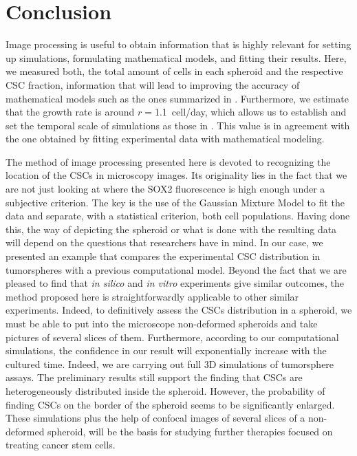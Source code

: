 \documentclass[fleqn,10pt]{wlscirep}
\begin{document}
\section*{Conclusion} \label{s: conc}

Image processing is useful to obtain information that is highly relevant for setting up simulations, formulating mathematical models, and fitting their results. Here, we measured both, the total amount of cells in each spheroid and the respective CSC fraction, information that will lead to improving the accuracy of mathematical models such as the ones summarized in \cite{barberis2021diff}. Furthermore, we estimate that the growth rate is around $r=$\SI{1.1}{cell/day}, which allows us to establish and set the temporal scale of simulations as those in \cite{barberis2021percolation}. This value is in agreement with the one obtained by fitting experimental data with mathematical modeling\cite{benitez2021}. 


The method of image processing presented here is devoted to recognizing the location of the CSCs in microscopy images. Its originality lies in the fact that we are not just looking at where the SOX2 fluorescence is high enough under a subjective criterion. The key is the use of the Gaussian Mixture Model to fit the data and separate, with a statistical criterion, both cell populations. Having done this, the way of depicting the spheroid or what is done with the resulting data will depend on the questions that researchers have in mind. In our case, we presented an example that compares the experimental CSC distribution in tumorspheres with a previous computational model. Beyond the fact that we are pleased to find that \emph{in silico} and \emph{in vitro} experiments give similar outcomes, the method proposed here is straightforwardly applicable to other similar experiments. Indeed, to definitively assess the CSCs distribution in a spheroid, we must be able to put into the microscope non-deformed spheroids and take pictures of several slices of them.
Furthermore, according to our computational simulations, the confidence in our result will exponentially increase with the cultured time. Indeed, we are carrying out full 3D simulations of tumorsphere assays. The preliminary results still support the finding that CSCs are heterogeneously distributed inside the spheroid. However, the probability of finding CSCs on the border of the spheroid seems to be significantly enlarged. These simulations plus the help of confocal images of several slices of a non-deformed spheroid, will be the basis for studying further therapies focused on treating cancer stem cells.      
\end{document}
